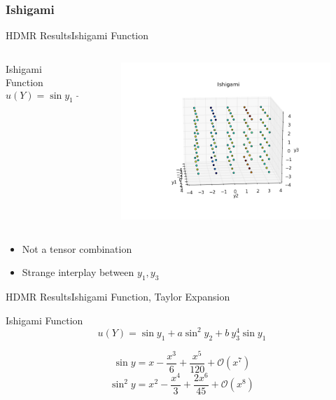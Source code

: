 \documentclass{beamer}
\begin{document}
\subsubsection{Ishigami}
\begin{frame}{HDMR Results}{Ishigami Function}\vspace{-20pt}
  \begin{columns}
    \begin{column}{0.6\textwidth}
      \begin{block}{Ishigami Function}
        \[u(Y) = \sin{y_1} + a\sin^2{y_2} + b\ y_3^4\sin{y_1}\]
      \end{block}
    \end{column}
    \begin{column}{0.4\textwidth}
        \begin{figure}[h!]
          \centering
          \includegraphics[width=\linewidth]{anlmodels/ishigami}
        \end{figure}
    \end{column}
  \end{columns}
  \begin{itemize}
    \item Not a tensor combination
    \item Strange interplay between $y_1,y_3$
  \end{itemize}
\end{frame}
\begin{frame}{HDMR Results}{Ishigami Function, Taylor Expansion}\vspace{-20pt}
      \begin{block}{Ishigami Function}
        \[u(Y) = \sin{y_1} + a\sin^2{y_2} + b\ y_3^4\sin{y_1}\]
      \end{block}
\vfill
\begin{equation*}
  \sin{y} = x - \frac{x^3}{6} + \frac{x^5}{120} + \mathcal{O}(x^7)
\end{equation*}
\vfill
\begin{equation*}
  \sin^2{y} = x^2 - \frac{x^4}{3} + \frac{2x^6}{45} + \mathcal{O}(x^8)
\end{equation*}
\vfill
\end{frame}
\end{document}
